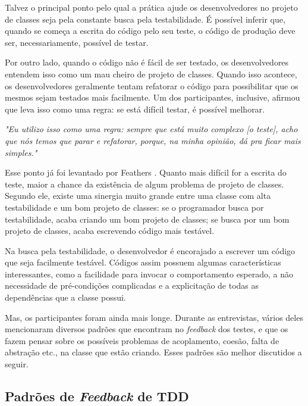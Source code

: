 \documentclass[conference]{IEEEtran}
\begin{document}
Talvez o principal ponto pelo qual a prática ajude os desenvolvedores no projeto de classes 
seja pela constante busca pela testabilidade. É possível inferir que, quando se 
começa a escrita do código pelo seu teste, o código de produção deve ser, necessariamente,
possível de testar.

Por outro lado, quando o código não é fácil de ser testado, os desenvolvedores
entendem isso como um mau cheiro de projeto de classes. Quando isso acontece,
os desenvolvedores geralmente tentam refatorar o código para possibilitar que
os mesmos sejam testados mais facilmente.
Um dos participantes, inclusive, afirmou que leva isso como uma regra:
se está difícil testar, é possível melhorar.

\begin{framed}
\textit{"Eu utilizo isso como uma regra: sempre que está muito complexo [o teste],
acho que nós temos que parar e refatorar, porque, na minha opinião, dá
pra ficar mais simples."}
\end{framed}

Esse ponto já foi levantado por Feathers \cite{feathers-synergy}.
Quanto mais difícil for a escrita do teste, maior a chance da existência de
algum problema de projeto de classes. Segundo ele, 
existe uma sinergia muito grande entre uma classe com alta testabilidade e um bom projeto de classes: 
se o programador busca por testabilidade, acaba criando um bom projeto de classes; se 
busca por um bom projeto de classes, acaba escrevendo código mais
testável.

Na busca pela testabilidade, o desenvolvedor é encorajado a escrever um
código que seja facilmente testável. Códigos assim possuem algumas
características interessantes, como a facilidade para invocar o comportamento
esperado, a não necessidade de pré-condições complicadas e a explicitação de
todas as dependências que a classe possui.

Mas, os participantes foram ainda mais longe. Durante as entrevistas,
vários deles mencionaram diversos padrões que encontram no \textit{feedback} dos testes,
e que os fazem pensar sobre os possíveis problemas de acoplamento,
coesão, falta de abstração etc., na classe que estão criando.
Esses padrões são melhor discutidos a seguir.

\subsection{Padrões de \textit{Feedback} de TDD}
\label{padroes-tdd}
\end{document}
